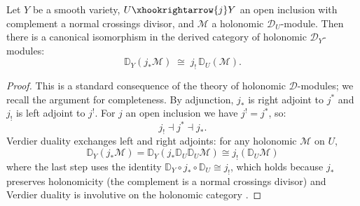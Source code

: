 \begin{lemma}%
\label{lem:verdier-extension-exchange}
Let $Y$ be a smooth variety, $U \xhookrightarrow{j} Y$ an open inclusion
with complement a normal crossings divisor, and $\mathcal{M}$ a holonomic
$\mathcal{D}_U$-module.  Then there is a canonical isomorphism in the
derived category of holonomic $\mathcal{D}_Y$-modules:
\[
\mathbb{D}_Y(j_*\mathcal{M}) \;\cong\; j_!\,\mathbb{D}_U(\mathcal{M}).
\]
\end{lemma}

\begin{proof}
This is a standard consequence of the theory of holonomic
$\mathcal{D}$-modules; we recall the argument for completeness.  By
adjunction, $j_*$ is right adjoint to $j^*$ and $j_!$ is left adjoint to
$j^!$.  For $j$ an open inclusion we have $j^! = j^*$, so:
\[
j_! \dashv j^* \dashv j_*.
\]
Verdier duality exchanges left and right adjoints: for any holonomic
$\mathcal{M}$ on $U$,
\[
\mathbb{D}_Y(j_*\mathcal{M})
= \mathbb{D}_Y(j_* \mathbb{D}_U \mathbb{D}_U \mathcal{M})
\cong j_!(\mathbb{D}_U \mathcal{M})
\]
where the last step uses the identity
$\mathbb{D}_Y \circ j_* \circ \mathbb{D}_U \cong j_!$, which holds because
$j_*$ preserves holonomicity (the complement is a normal crossings divisor)
and Verdier duality is involutive on the holonomic category
\cite[Theorem~2.6.1]{HTT08}.
\end{proof}

